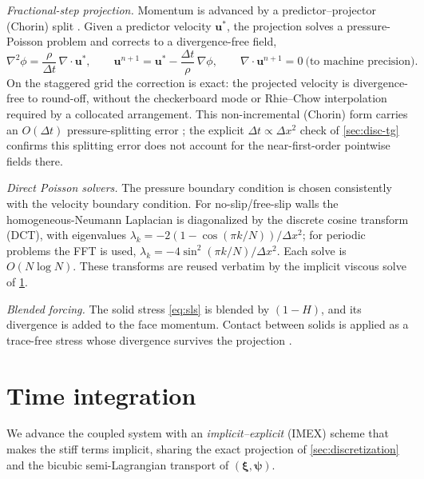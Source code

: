 \documentclass[final,3p,times]{elsarticle}
\theoremstyle{remark}
\newcommand{\uv}{\bm{u}}                 %
\newcommand{\xiv}{\bm{\xi}}              %
\newcommand{\psib}{\bm{\psi}}           %
\newcommand{\grad}{\nabla}
\newcommand{\dive}{\grad\!\cdot\!}
\newcommand{\dt}{\Delta t}
\newcommand{\dx}{\Delta x}
\begin{document}
\emph{Fractional-step projection.}
Momentum is advanced by a predictor--projector (Chorin) split \cite{Chorin1968}. Given a
predictor velocity $\uv^{*}$, the projection solves a pressure-Poisson problem and
corrects to a divergence-free field,
\begin{equation}
\nabla^2\phi = \frac{\rho}{\dt}\,\dive\uv^{*},
\qquad
\uv^{n+1}=\uv^{*}-\frac{\dt}{\rho}\,\grad\phi,
\qquad
\dive\uv^{n+1}=0\ \text{(to machine precision).}
\label{eq:project}
\end{equation}
On the staggered grid the correction is exact: the projected velocity is
divergence-free to round-off, without the checkerboard mode or Rhie--Chow interpolation
required by a collocated arrangement. This non-incremental (Chorin) form carries an $O(\dt)$
pressure-splitting error \cite{GuermondMinevShen2006}; the explicit $\dt\propto\dx^2$ check of
\cref{sec:disc-tg} confirms this splitting error does not account for the near-first-order
pointwise fields there.

\emph{Direct Poisson solvers.}
The pressure boundary condition is chosen consistently with the velocity boundary
condition. For no-slip/free-slip walls the homogeneous-Neumann Laplacian is diagonalized
by the discrete cosine transform (DCT), with eigenvalues
$\lambda_{k}=-2\!\left(1-\cos(\pi k/N)\right)/\dx^2$; for periodic problems the FFT is
used, $\lambda_{k}=-4\sin^2(\pi k/N)/\dx^2$. Each solve is $O(N\log N)$. These
transforms are reused verbatim by the implicit viscous solve of \cref{sec:time}.

\emph{Blended forcing.}
The solid stress \cref{eq:sls} is blended by $(1-H)$, and its divergence is added to the
face momentum. Contact between solids is applied as a trace-free stress whose
divergence survives the projection \cite{Rycroft2020}.

\section{Time integration}
\label{sec:time}

We advance the coupled system with an \emph{implicit--explicit} (IMEX) scheme that makes the
stiff terms implicit, sharing the exact projection of \cref{sec:discretization} and the bicubic
semi-Lagrangian transport of $(\xiv,\psib)$.
\end{document}
